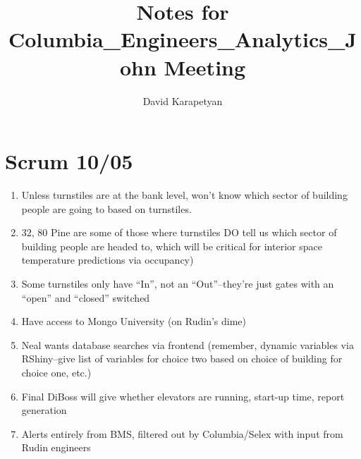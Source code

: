 \documentclass[12pt,a4paper]{article}
\author{David Karapetyan}
\title{Notes for Columbia_Engineers_Analytics_John Meeting}
\begin{document}
\section{Scrum 10/05}
\begin{enumerate}
	\item Unless turnstiles are at the bank level, won't know which sector of 
	building people are going to based on turnstiles.
	\item 32, 80 Pine are some of 
	those where turnstiles DO tell us which sector of building people are 
	headed to, which will be critical for interior space temperature 
	predictions via occupancy)
	\item Some turnstiles only have ``In'', not an ``Out''--they're just gates 
	with an ``open'' and ``closed'' switched
	\item Have access to Mongo University (on Rudin's dime)
	\item Neal wants database searches via frontend (remember, dynamic 
	variables via RShiny--give list of variables for choice two based on choice 
	of building for choice one, etc.)
	\item Final DiBoss will give whether elevators are running, start-up time, 
	report generation 
	\item Alerts entirely from BMS, filtered out by Columbia/Selex with input 
	from Rudin engineers
	
\end{enumerate}
\end{document}

